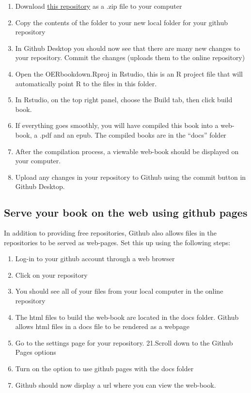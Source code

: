 \documentclass[]{book}
\providecommand{\tightlist}{%
  \setlength{\itemsep}{0pt}\setlength{\parskip}{0pt}}
\theoremstyle{definition}
\theoremstyle{definition}
\theoremstyle{definition}
\theoremstyle{remark}
\begin{document}
\begin{enumerate}
\def\labelenumi{\arabic{enumi}.}
\setcounter{enumi}{8}
\tightlist
\item
  Download \href{https://github.com/CrumpLab/OER_bookdown}{this
  repository} as a .zip file to your computer
\item
  Copy the contents of the folder to your new local folder for your
  github repository
\item
  In Github Desktop you should now see that there are many new changes
  to your repository. Commit the changes (uploads them to the online
  repository)
\item
  Open the OERbookdown.Rproj in Rstudio, this is an R project file that
  will automatically point R to the files in this folder.
\item
  In Rstudio, on the top right panel, choose the Build tab, then click
  build book.
\item
  If everything goes smoothly, you will have compiled this book into a
  web-book, a .pdf and an epub. The compiled books are in the ``docs''
  folder
\item
  After the compilation process, a viewable web-book should be displayed
  on your computer.
\item
  Upload any changes in your repository to Github using the commit
  button in Github Desktop.
\end{enumerate}

\subsection{Serve your book on the web using github
pages}\label{serve-your-book-on-the-web-using-github-pages}

In addition to providing free repositories, Github also allows files in
the repositories to be served as web-pages. Set this up using the
following steps:

\begin{enumerate}
\def\labelenumi{\arabic{enumi}.}
\setcounter{enumi}{15}
\tightlist
\item
  Log-in to your github account through a web browser
\item
  Click on your repository
\item
  You should see all of your files from your local computer in the
  online repository
\item
  The html files to build the web-book are located in the docs folder.
  Github allows html files in a docs file to be rendered as a webpage
\item
  Go to the settings page for your repository. 21.Scroll down to the
  Github Pages options
\item
  Turn on the option to use github pages with the docs folder
\item
  Github should now display a url where you can view the web-book.
\end{enumerate}
\end{document}
